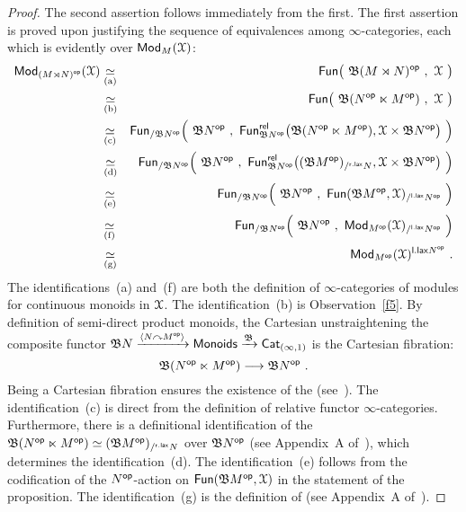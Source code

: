 \begin{proof}
The second assertion follows immediately from the first.  
The first assertion is proved upon justifying the sequence of equivalences among $\infty$-categories, each which is evidently over $\Mod_M(\cX)$:
\begin{eqnarray*}
\Mod_{\left( M \rtimes N \right)^{\op} }(\cX)
&
\underset{\rm (a)}\simeq
&
\Fun\bigl( 
~
\fB (M \rtimes N )^{\op}
~,~ 
\cX 
~
\bigr)
\\
&
\underset{\rm (b)}\simeq
&
\Fun\bigl( 
~
\fB ( N^{\op} \ltimes M^{\op} )
~,~ 
\cX 
~
\bigr)
\\
&
\underset{\rm (c)}\simeq
&
\Fun_{/\fB N^{\op}}
\Bigl(
~
\fB N^{\op}
~,~
\Fun^{\sf rel}_{\fB N^{\op}}
\bigl( 
\fB ( N^{\op} \ltimes M^{\op} )
,
\cX \times \fB N^{\op}
\bigr)
~
\Bigr)
\\
&
\underset{\rm (d)}\simeq
&
\Fun_{/\fB N^{\op}}\Bigl( 
~
\fB N^{\op}
~,~ 
\Fun^{\sf rel}_{\fB N^{\op}}
\bigl( 
(\fB M^{\op})_{/^{\sf r.lax} N}
,
\cX \times \fB N^{\op}
\bigr)
~
\Bigr)
\\
&
\underset{\rm (e)}\simeq
&
\Fun_{/\fB N^{\op}}\Bigl( 
~
\fB N^{\op}
~,~ 
\Fun(
\fB M^{\op}
,
\cX)_{/^{\sf l.lax} N^{\op}}
~
\Bigr)
\\
&
\underset{\rm (f)}\simeq
&
\Fun_{/\fB N^{\op}}\Bigl( 
~
\fB N^{\op}
~,~
\Mod_{M^{\op}}(\cX)_{/^{\sf l.lax} N^{\op}}
~
\Bigr)
\\
&
\underset{\rm (g)}\simeq
&
\Mod_{M^{\op}}(\cX)^{{\sf l.lax}N^{\op}}
~.
\end{eqnarray*}
The identifications~(a) and~(f) are both the definition of $\infty$-categories of modules for continuous monoids in $\cX$.
The identification~(b) is Observation~\ref{f5}.
By definition of semi-direct product monoids, 
the Cartesian unstraightening the composite functor 
$
\fB N
\xra{\lag N \lacts M^{\op}\rag } 
{\sf Monoids}
\xra{\fB}
\Cat_{(\infty,1)}
$
is the Cartesian fibration:
\[
\fB (N^{\op} \ltimes M^{\op}) 
\longrightarrow 
\fB N^{\op}
~.
\]
Being a Cartesian fibration ensures the existence of the  (see~\cite{fib}).
The identification~(c) is direct from the definition of relative functor $\infty$-categories.  
Furthermore, there is a definitional identification of the  $\fB (N^{\op} \ltimes M^{\op})  \simeq (\fB M^{\op})_{/^{\sf r.lax}N}$ over $\fB N^{\op}$ (see Appendix~A of~\cite{non-com-geom}), which determines the identification~(d).
The identification~(e) follows from the codification of the $N^{\op}$-action on $\Fun(\fB M^{\op} , \cX)$ in the statement of the proposition.
The identification~(g) is the definition of  (see Appendix~A of~\cite{non-com-geom}).




\end{proof}










